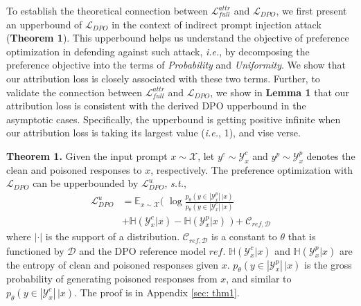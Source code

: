 \documentclass[11pt]{article}
\begin{document}
To establish the theoretical connection between $\mathcal L^{attr}_{full}$ and $\mathcal L_{DPO}$, we first present an upperbound of $\mathcal L_{DPO}$ in the context of indirect prompt injection attack (\textbf{Theorem 1}).
This upperbound helps us understand the objective of preference optimization in defending against such attack, \emph{i.e.}, by decomposing the preference objective into the terms of \textit{Probability} and \textit{Uniformity}.
We show that our attribution loss is closely associated with these two terms. 
Further, to validate the connection between $\mathcal L^{attr}_{full}$ and $\mathcal L_{DPO}$, we show in \textbf{Lemma 1} that our attribution loss is consistent with the derived DPO upperbound in the asymptotic cases.
Specifically, the upperbound is getting positive infinite when our attribution loss is taking its largest value (\emph{i.e.}, 1), and vise verse.

\vspace{1mm}
\noindent\textbf{Theorem 1.} Given the input prompt $x\sim \mathcal X$, let $y^c\sim \mathcal Y^c_x$ and $y^p\sim \mathcal Y^p_x$ denotes the clean and poisoned responses to $x$, respectively. 
The preference optimization with $\mathcal L_{DPO}$ can be upperbounded by $\mathcal L_{DPO}^u$, \emph{s.t.},
%
\begin{equation}
  \begin{split} \label{eq: L_dpo_u}
    \mathcal L^u_{DPO} &= \mathbb E_{x\sim \mathcal X } ( \,\,\log \frac{p_\theta(y\in |\mathcal Y^p_x|\,|x)}{p_\theta(y\in |\mathcal Y^c_x|\,|x)} \\
    &+ \mathbb H(\mathcal Y^c_x|x) - \mathbb H(\mathcal Y^p_x|x) \,\,) + \mathcal C_{ref, \mathcal D}
  \end{split}
\end{equation}
%
where $|\cdot|$ is the support of a distribution. $\mathcal C_{ref, \mathcal D}$ is a constant to $\theta$ that is functioned by $\mathcal D$ and the DPO reference model $ref$.
$\mathbb H(\mathcal Y^c_x|x)$ and  $\mathbb H(\mathcal Y^p_x|x)$ are the entropy of clean and poisoned responses given $x$.
$p_\theta(y\in |\mathcal Y^p_x|\,|x)$ is the gross  probability of generating poisoned responses from $x$, and similar to $p_\theta(y\in |\mathcal Y^c_x|\,|x)$. 
The proof is in Appendix \ref{sec: thm1}.
\end{document}
